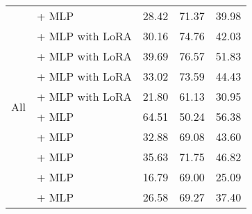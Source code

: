 \begin{longtable}{llccc}
    \multirow{10}{*}{All}                 & \citep{radford2019language} + MLP                                      & 28.42                                & 71.37              & 39.98             \\
                                          & \citep{llama3.2-1b-instruct} + MLP with LoRA                           & 30.16                                & 74.76              & 42.03             \\
                                          & \citep{abdin2024phi3technicalreporthighly} + MLP with LoRA             & 39.69                                & 76.57              & 51.83             \\
                                          & \citep{qwen2.5} + MLP with LoRA                                        & 33.02                                & 73.59              & 44.43             \\
                                          & \citep{gemma_2024} + MLP with LoRA                                     & 21.80                                & 61.13              & 30.95             \\
                                          & \citep{DBLP:journals/corr/abs-1911-02116} + MLP                        & 64.51                                & 50.24              & 56.38             \\
                                          & \citep{DBLP:journals/corr/abs-1910-13461} + MLP                        & 32.88                                & 69.08              & 43.60             \\
                                          & \citep{DBLP:journals/corr/abs-1810-04805} + MLP                        & 35.63                                & 71.75              & 46.82             \\
                                          & \citep{dai2020funneltransformer} + MLP                                 & 16.79                                & 69.00              & 25.09             \\
                                          & \citep{clark2020electra} + MLP                                         & 26.58                                & 69.27              & 37.40             \\
    \midrule


\end{longtable}
